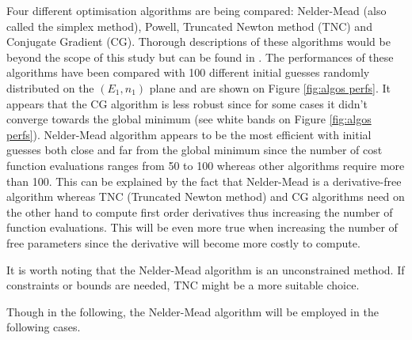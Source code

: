 Four different optimisation algorithms are being compared: 
Nelder-Mead (also called the simplex method), Powell, Truncated Newton method (TNC) and Conjugate Gradient (CG).
Thorough descriptions of these algorithms would be beyond the scope of this study but can be found in .
The performances of these algorithms have been compared with 100 different initial guesses randomly distributed on the $(E_1,n_1)$ plane and are shown on Figure \ref{fig:algos perfs}.
It appears that the CG algorithm is less robust since for some cases it didn't converge towards the global minimum (see white bands on Figure \ref{fig:algos perfs}).
Nelder-Mead algorithm appears to be the most efficient with initial guesses both close and far from the global minimum since the number of cost function evaluations ranges from 50 to 100 whereas other algorithms require more than 100.
This can be explained by the fact that Nelder-Mead is a derivative-free algorithm whereas TNC (Truncated Newton method) and CG algorithms need on the other hand to compute first order derivatives thus increasing the number of function evaluations.
This will be even more true when increasing the number of free parameters since the derivative will become more costly to compute.

It is worth noting that the Nelder-Mead algorithm is an unconstrained method.
If constraints or bounds are needed, TNC might be a more suitable choice.

Though in the following, the Nelder-Mead algorithm will be employed in the following cases.
